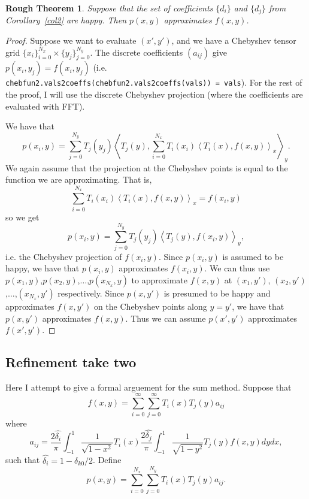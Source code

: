\documentclass{article}
\newtheorem{roughtheorem}{Rough Theorem}[section]
\begin{document}
\begin{roughtheorem}
Suppose that the set of coefficients $\{d_i\}$ and $\{d_j\}$ from Corollary~\ref{col2} are happy. Then $p(x,y)$ approximates $f(x,y)$.	
\end{roughtheorem}
\begin{proof}
Suppose we want to evaluate $(x',y')$, and we have a Chebyshev tensor grid $\{x_i\}_{i=0}^{N_x}\times \{y_j\}_{j=0}^{N_y}$. The discrete coefficients $(a_{ij})$ give $p(x_i,y_j) = f(x_i,y_j)$ (i.e. {\tt chebfun2.vals2coeffs(chebfun2.vals2coeffs(vals)) = vals}). For the rest of the proof, I will use the discrete Chebyshev projection (where the coefficients are evaluated with FFT).

We have that
\begin{equation}
p(x_i,y) = \sum_{j=0}^{N_y} T_j(y_j) \left < T_j(y),\sum_{i=0}^{N_x} T_i(x_i) \left <  T_i(x),f(x,y) \right >_x \right >_y.
\end{equation}
We again assume that the projection at the Chebyshev points is equal to the function we are approximating. That is,
\begin{equation}
\sum_{i=0}^{N_x} T_i(x_i) \left <  T_i(x),f(x,y) \right >_x = 	f(x_i,y)
\end{equation}
so we get
\begin{equation}
p(x_i,y) = \sum_{j=0}^{N_y} T_j(y_j) \left < T_j(y),f(x_i,y)\right >_y,
\end{equation}
i.e. the Chebyshev projection of $f(x_i,y)$. Since $p(x_i,y)$ is assumed to be happy, we have that $p(x_i,y)$ approximates $f(x_i,y)$. We can thus use $p(x_1,y)$,$p(x_2,y)$,$\dots$,$p(x_{N_x},y)$ to approximate $f(x,y)$ at $(x_1,y')$, $(x_2,y')$,$\dots$,$(x_{N_x},y')$ respectively. Since $p(x,y')$ is presumed to be happy and approximates $f(x,y')$ on the Chebyshev points along $y=y'$, we have that $p(x,y')$ approximates $f(x,y)$. Thus we can assume $p(x',y')$ approximates $f(x',y')$.
\end{proof}


\subsection{Refinement take two}
Here I attempt to give a formal arguement for the sum method. Suppose that 
$$
f(x,y) = \sum_{i=0}^{\infty} \sum_{j=0}^{\infty} T_i(x)T_j(y)a_{ij}
$$
where 
$$
a_{ij} = \frac{2 \hat{\delta_i}}{\pi} \int_{-1}^{1} \frac{1}{\sqrt{1-x^2}} T_i(x) \frac{2 \hat{\delta_j}}{\pi} \int_{-1}^{1} \frac{1}{\sqrt{1-y^2}} T_j(y) f(x,y) dy dx,
$$
such that $\hat{\delta_i} = 1 - \delta_{k0}/2$. Define
\begin{equation}
p(x,y) =  \sum_{i=0}^{N_x} \sum_{j=0}^{N_y} T_i(x)T_j(y)a_{ij}.
\end{equation}
\end{document}
